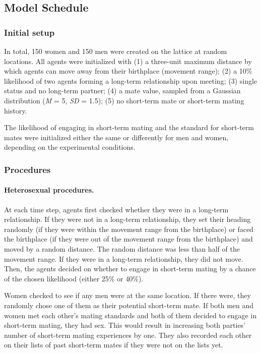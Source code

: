 \documentclass[
  11pt,
]{article}
\begin{document}
\hypertarget{model-schedule}{%
\subsection{Model Schedule}\label{model-schedule}}

\hypertarget{initial-setup}{%
\subsubsection{Initial setup}\label{initial-setup}}

In total, 150 women and 150 men were created on the lattice at random
locations. All agents were initialized with (1) a three-unit maximum
distance by which agents can move away from their birthplace (movement
range); (2) a 10\% likelihood of two agents forming a long-term
relationship upon meeting; (3) single status and no long-term partner;
(4) a mate value, sampled from a Gaussian distribution (\emph{M} = 5,
\emph{SD} = 1.5); (5) no short-term mate or short-term mating history.

The likelihood of engaging in short-term mating and the standard for
short-term mates were initialized either the same or differently for men
and women, depending on the experimental conditions.

\hypertarget{procedures}{%
\subsubsection{Procedures}\label{procedures}}

\hypertarget{heterosexual-procedures.}{%
\paragraph{Heterosexual procedures.}\label{heterosexual-procedures.}}

At each time step, agents first checked whether they were in a long-term
relationship. If they were not in a long-term relationship, they set
their heading randomly (if they were within the movement range from the
birthplace) or faced the birthplace (if they were out of the movement
range from the birthplace) and moved by a random distance. The random
distance was less than half of the movement range. If they were in a
long-term relationship, they did not move. Then, the agents decided on
whether to engage in short-term mating by a chance of the chosen
likelihood (either 25\% or 40\%).

Women checked to see if any men were at the same location. If there
were, they randomly chose one of them as their potential short-term
mate. If both men and women met each other's mating standards and both
of them decided to engage in short-term mating, they had sex. This would
result in increasing both parties' number of short-term mating
experiences by one. They also recorded each other on their lists of past
short-term mates if they were not on the lists yet.
\end{document}

